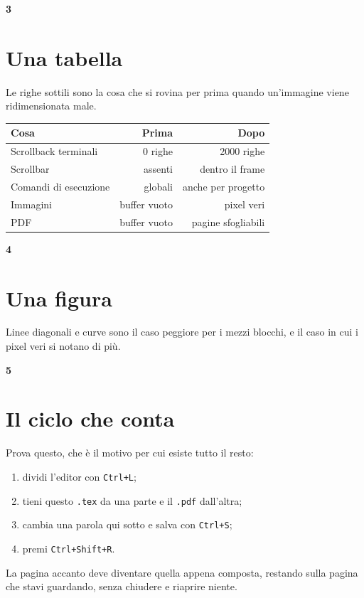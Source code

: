 \documentclass[12pt,a4paper]{article}
\newcommand{\numerone}[1]{%
  {\centering\fontsize{90}{90}\selectfont\bfseries\textcolor{gray!30}{#1}\par}%
  \vspace{0.5em}%
}
\begin{document}
\numerone{3}
\section{Una tabella}
Le righe sottili sono la cosa che si rovina per prima quando un'immagine viene
ridimensionata male.

\vspace{1em}
\begin{center}
\begin{tabular}{|l|r|r|}
\hline
\textbf{Cosa} & \textbf{Prima} & \textbf{Dopo} \\
\hline
Scrollback terminali & 0 righe & 2000 righe \\
Scrollbar & assenti & dentro il frame \\
Comandi di esecuzione & globali & anche per progetto \\
Immagini & buffer vuoto & pixel veri \\
PDF & buffer vuoto & pagine sfogliabili \\
\hline
\end{tabular}
\end{center}
\newpage

\numerone{4}
\section{Una figura}
\begin{center}
\end{center}
Linee diagonali e curve sono il caso peggiore per i mezzi blocchi, e il caso in
cui i pixel veri si notano di più.
\newpage

\numerone{5}
\section{Il ciclo che conta}
Prova questo, che è il motivo per cui esiste tutto il resto:
\begin{enumerate}
  \item dividi l'editor con \texttt{Ctrl+L};
  \item tieni questo \texttt{.tex} da una parte e il \texttt{.pdf} dall'altra;
  \item cambia una parola qui sotto e salva con \texttt{Ctrl+S};
  \item premi \texttt{Ctrl+Shift+R}.
\end{enumerate}
La pagina accanto deve diventare quella appena composta, restando sulla pagina
che stavi guardando, senza chiudere e riaprire niente.
\end{document}
